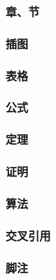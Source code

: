 \subsubsection{章、节}

\subsubsection{插图}

\subsubsection{表格}

\subsubsection{公式}

\subsubsection{定理}

\subsubsection{证明}

\subsubsection{算法}

\subsubsection{交叉引用}

\subsubsection{脚注}

